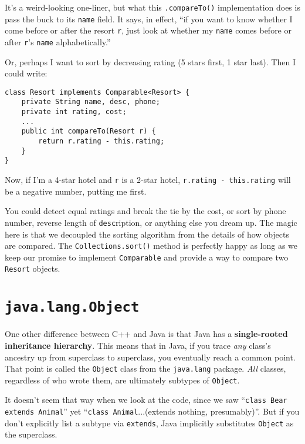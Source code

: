 It's a weird-looking one-liner, but what this \texttt{.compareTo()}
implementation does is pass the buck to its \texttt{name} field. It says, in
effect, ``if you want to know whether I come before or after the resort
\texttt{r}, just look at whether my \texttt{name} comes before or after
\texttt{r}'s \texttt{name} alphabetically.''

Or, perhaps I want to sort by decreasing rating (5 stars first, 1 star last).
Then I could write:

\begin{Verbatim}[fontsize=\small,samepage=true,frame=single]
class Resort implements Comparable<Resort> {
    private String name, desc, phone;
    private int rating, cost;
    ...
    public int compareTo(Resort r) {
        return r.rating - this.rating;
    }
}
\end{Verbatim}

Now, if I'm a 4-star hotel and \texttt{r} is a 2-star hotel, \texttt{r.rating
- this.rating} will be a negative number, putting me first.

You could detect equal ratings and break the tie by the cost, or sort by phone
number, reverse length of \texttt{desc}ription, or anything else you dream up.
The magic here is that we decoupled the sorting algorithm from the details of
how objects are compared. The \texttt{Collections.sort()} method is perfectly
happy as long as we keep our promise to implement \texttt{Comparable} and
provide a way to compare two \texttt{Resort} objects.


\section{\texttt{java.lang.Object}}

One other difference between C++ and Java is that Java has a
\textbf{single-rooted inheritance hierarchy}. This means that in Java, if you
trace \textit{any} class's ancestry up from superclass to superclass, you
eventually reach a common point. That point is called the \texttt{Object}
class from the \texttt{java.lang} package. \textit{All} classes, regardless of
who wrote them, are ultimately subtypes of \texttt{Object}.

It doesn't seem that way when we look at the code, since we saw
``\texttt{class Bear extends Animal}'' yet ``\texttt{class Animal}...(extends
nothing, presumably)''. But if you don't explicitly list a subtype via
\texttt{extends}, Java implicitly substitutes \texttt{Object} as the
superclass.

